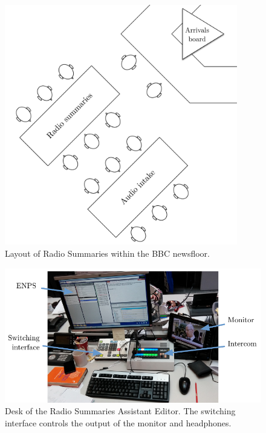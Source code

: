 \begin{figure}
	\centering
	\includegraphics[width=4in]{figs/news-layout.pdf}
  \caption{Layout of Radio Summaries within the BBC newsfloor.}
	\label{fig:newsroom-layout}
\end{figure}

\begin{figure}
  \centering
  \includegraphics[width=\columnwidth]{figs/news-desk-labelled.pdf}
  \caption{Desk of the Radio Summaries Assistant Editor. The switching interface controls the output of the monitor and
    headphones.}
  \label{fig:news-desktop}
\end{figure}

